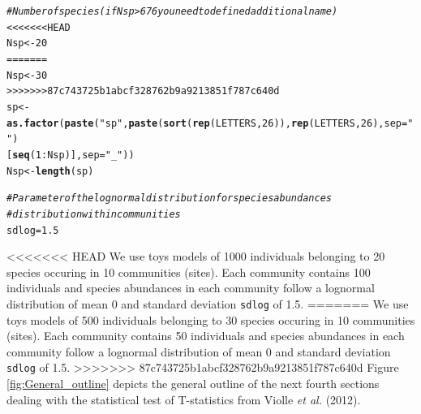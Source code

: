 \documentclass[12pt]{article}\usepackage[]{graphicx}\usepackage[]{color}
\makeatletter
\newcommand{\hlnum}[1]{\textcolor[rgb]{0.686,0.059,0.569}{#1}}%
\newcommand{\hlstr}[1]{\textcolor[rgb]{0.192,0.494,0.8}{#1}}%
\newcommand{\hlcom}[1]{\textcolor[rgb]{0.678,0.584,0.686}{\textit{#1}}}%
\newcommand{\hlopt}[1]{\textcolor[rgb]{0,0,0}{#1}}%
\newcommand{\hlstd}[1]{\textcolor[rgb]{0.345,0.345,0.345}{#1}}%
\newcommand{\hlkwb}[1]{\textcolor[rgb]{0.69,0.353,0.396}{#1}}%
\newcommand{\hlkwc}[1]{\textcolor[rgb]{0.333,0.667,0.333}{#1}}%
\newcommand{\hlkwd}[1]{\textcolor[rgb]{0.737,0.353,0.396}{\textbf{#1}}}%
\newenvironment{kframe}{%
 \def\at@end@of@kframe{}%
 \ifinner\ifhmode%
  \def\at@end@of@kframe{\end{minipage}}%
  \begin{minipage}{\columnwidth}%
 \fi\fi%
 \def\FrameCommand##1{\hskip\@totalleftmargin \hskip-\fboxsep
 \colorbox{shadecolor}{##1}\hskip-\fboxsep
     \hskip-\linewidth \hskip-\@totalleftmargin \hskip\columnwidth}%
 \MakeFramed {\advance\hsize-\width
   \@totalleftmargin\z@ \linewidth\hsize
   \@setminipage}}%
 {\par\unskip\endMakeFramed%
 \at@end@of@kframe}
\newenvironment{knitrout}{}{} %
\makeatother
\begin{document}
\begin{landscape}
\begin{knitrout}
\begin{kframe}
\begin{alltt}
\hlcom{#Number of species (if Nsp > 676 you need to defined additional name)}
<<<<<<< HEAD
\hlstd{Nsp} \hlkwb{<-} \hlnum{20}
=======
\hlstd{Nsp} \hlkwb{<-} \hlnum{30}
>>>>>>> 87c743725b1abcf328762b9a9213851f787c640d
\hlstd{sp} \hlkwb{<-} \hlkwd{as.factor}\hlstd{(}\hlkwd{paste}\hlstd{(}\hlstr{"sp"}\hlstd{,} \hlkwd{paste}\hlstd{(}\hlkwd{sort}\hlstd{(}\hlkwd{rep}\hlstd{(LETTERS,} \hlnum{26}\hlstd{)),} \hlkwd{rep}\hlstd{(LETTERS,} \hlnum{26}\hlstd{),}  \hlkwc{sep}\hlstd{=}\hlstr{""}\hlstd{)}
                     \hlstd{[}\hlkwd{seq}\hlstd{(}\hlnum{1}\hlopt{:}\hlstd{Nsp)],} \hlkwc{sep} \hlstd{=}\hlstr{"_"}\hlstd{))}
\hlstd{Nsp} \hlkwb{<-} \hlkwd{length}\hlstd{(sp)}

\hlcom{#Parameter of the log normal distribution for species abundances }
\hlcom{#distribution within communities}
\hlstd{sdlog} \hlkwb{=} \hlnum{1.5}
\end{alltt}
\end{kframe}
\end{knitrout}

<<<<<<< HEAD
We use toys models of 1000 individuals belonging to 20 species occuring in 10 communities (sites). Each community contains 100 individuals and species abundances in each community follow a lognormal distribution of mean 0 and standard deviation \texttt{sdlog} of 1.5.
=======
We use toys models of 500 individuals belonging to 30 species occuring in 10 communities (sites). Each community contains 50 individuals and species abundances in each community follow a lognormal distribution of mean 0 and standard deviation \texttt{sdlog} of 1.5.
>>>>>>> 87c743725b1abcf328762b9a9213851f787c640d
Figure \ref{fig:General_outline} depicts the general outline of the next fourth sections dealing with the statistical test of T-statistics from Violle \textit{et al.} (2012).


\end{landscape}
\end{document}
